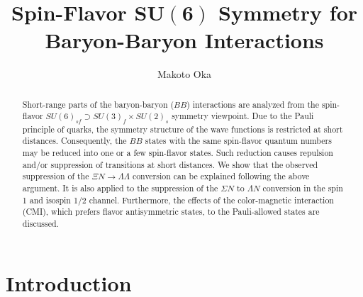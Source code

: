 \documentclass[aps,prd,showpacs,floatfix,reprint,nofootinbib]{revtex4-1}
\begin{document}
\title{Spin-Flavor $\bm{SU(6)}$ Symmetry for Baryon-Baryon Interactions}\label{oka}

\author{Makoto Oka}

\address{Advanced Science Research Center, Japan Atomic Energy Agency, 
Tokai 319-1195, Japan \\
and\\
Nishina Center for Accelerator-Based Science, RIKEN, Wako 351-0198, Japan\\
makoto.oka@riken.jp}

\begin{abstract}
Short-range parts of the baryon-baryon ($BB$) interactions are analyzed 
from the spin-flavor $SU(6)_{sf}\supset SU(3)_f \times SU(2)_s$ symmetry viewpoint.
Due to the Pauli principle of quarks, the symmetry structure of the wave functions is restricted at short distances.
Consequently, the $BB$ states with the same spin-flavor quantum numbers may be reduced into one or a few
spin-flavor states. Such reduction causes repulsion and/or suppression of transitions at short distances.
We show that the observed suppression of the $\Xi N \to \Lambda\Lambda$ conversion
can be explained following the above argument. 
It is also applied to the suppression of the $\Sigma N$ to $\Lambda N$ conversion in the spin 1 and isospin 1/2
channel. 
Furthermore, the effects of the color-magnetic interaction (CMI), which prefers flavor antisymmetric states, 
to the Pauli-allowed states are discussed.
\end{abstract}

\maketitle

\section  {Introduction}
\label{sec:Introduction}
\end{document}
